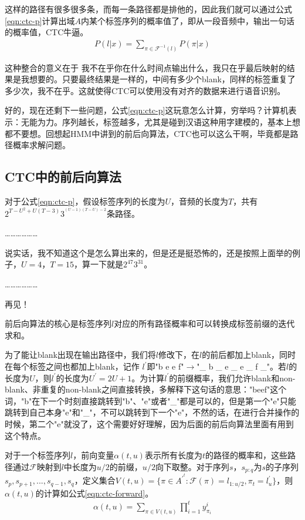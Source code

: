 这样的路径有很多很多条，而每一条路径都是排他的，因此我们就可以通过公式\ref{eqn:ctc-p}计算出域$A$内某个标签序列的概率值了，即从一段音频中，输出一句话的概率值，CTC牛逼。
\begin{align}
\label{eqn:ctc-p}
  P(l|x) = \sum_{\pi\in{\mathcal{F}^{-1}(l)}}P(\pi|x)
\end{align}

这种整合的意义在于 我不在乎你在什么时间点输出什么，我只在乎最后映射的结果是我想要的。只要最终结果是一样的，中间有多少个blank，同样的标签重复了多少次，我不在乎。这就使得CTC可以使用没有对齐的数据来进行语音识别。

好的，现在还剩下一些问题，公式\ref{eqn:ctc-p}这玩意怎么计算，穷举吗？计算机表示：无能为力。序列越长，标签越多，尤其是碰到汉语这种用字建模的，基本上想都不要想。回想起HMM中讲到的前后向算法，CTC也可以这么干啊，毕竟都是路径概率求解问题。

\subsection{CTC中的前后向算法}
对于公式\ref{eqn:ctc-p}，假设标签序列的长度为$U$，音频的长度为$T$，共有$2^{T-U^{2}+U(T-3)}3^{^{(U-1)(T-U)-2}}$条路径。

………………

说实话，我不知道这个是怎么算出来的，但是还是挺恐怖的，还是按照上面举的例子，$U=4$，$T=15$，算一下就是$2^{47}3^{31}$。

………………

再见！

前后向算法的核心是标签序列$l$对应的所有路径概率和可以转换成标签前缀的迭代求和。

为了能让blank出现在输出路径中，我们将$l$修改下，在$l$的前后都加上blank，同时在每个标签之间也都加上blank，记作 $l^{'}$即"b e e f"$\longrightarrow$"\_ b \_ e \_ e \_ f \_"。若$l$的长度为$U$，则$l^{'}$的长度为$U^{'}=2U+1$。为计算$l^{'}$的前缀概率，我们允许blank和non-blank、非重复的non-blank之间直接转换，多解释下这句话的意思："beef"这个词，"b"在下一个时刻直接跳转到"b"、"e"或者"\_"都是可以的，但是第一个"e"只能跳转到自己本身"e"和"\_"，不可以跳转到下一个"e"，不然的话，在进行合并操作的时候，第二个"e"就没了，这个需要好好理解，因为后面的前后向算法里面有用到这个特点。

对于一个标签序列$l$，前向变量$\alpha(t,u)$表示所有长度为$t$的路径的概率和，这些路径通过$\mathcal{F}$映射到$l$中长度为$u/2$的前缀，$u/2$向下取整。对于序列$s$，$s_{p:q}$为$s$的子序列${s_p, s_{p+1}, ..., s_{q-1}, s_q}$，定义集合$V(t,u)=\{\pi\in{A^{'^{t}}}:\mathcal{F}(\pi)=l_{1:{u/2}}, \pi_{t}=l_{u}^{'}\}$，则$\alpha(t,u)$的计算如公式\ref{eqn:ctc-forward}。
\begin{align}
\label{eqn:ctc-forward}
  \alpha(t,u) = \sum_{\pi\in{V(t,u)}} \prod_{i=1}^{t}y_{\pi_i}^{i}
\end{align}

